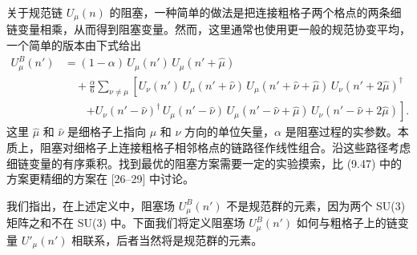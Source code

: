 关于规范链 $U_\mu(n)$ 的阻塞，一种简单的做法是把连接粗格子两个格点的两条细链变量相乘，从而得到阻塞变量。然而，这里通常也使用更一般的规范协变平均，一个简单的版本由下式给出
\begin{align}
  U^B_\mu(n') &= (1-\alpha)\,U_\mu(n')\,U_\mu(n'+\hat\mu) \nonumber\\
    &\quad + \frac{\alpha}{6}\sum_{\nu\neq\mu}
      \left[U_\nu(n')\,U_\mu(n'+\hat\nu)\,U_\mu(n'+\hat\nu+\hat\mu)\,
       U_\nu(n'+2\hat\mu)^\dagger \right. \nonumber\\
    &\qquad \left. + U_\nu(n'-\hat\nu)^\dagger\,U_\mu(n'-\hat\nu)\,
       U_\mu(n'-\hat\nu+\hat\mu)\,U_\nu(n'-\hat\nu+2\hat\mu)\right] .
\end{align}
这里 $\hat\mu$ 和 $\hat\nu$ 是细格子上指向 $\mu$ 和 $\nu$ 方向的单位矢量，$\alpha$ 是阻塞过程的实参数。本质上，阻塞对细格子上连接粗格子相邻格点的链路径作线性组合。沿这些路径考虑细链变量的有序乘积。找到最优的阻塞方案需要一定的实验摸索，比 (9.47) 中的方案更精细的方案在 [26--29] 中讨论。

我们指出，在上述定义中，阻塞场 $U^B_\mu(n')$ 不是规范群的元素，因为两个 SU(3) 矩阵之和不在 SU(3) 中。下面我们将定义阻塞场 $U^B_\mu(n')$ 如何与粗格子上的链变量 $U'_\mu(n')$ 相联系，后者当然将是规范群的元素。

